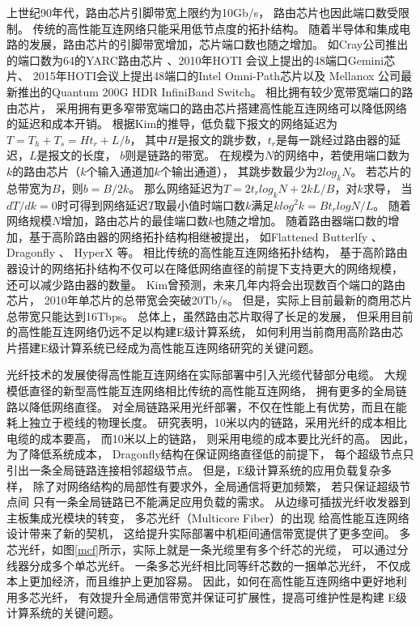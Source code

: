 上世纪90年代，路由芯片引脚带宽上限约为10Gb/s，
路由芯片也因此端口数受限制。
传统的高性能互连网络只能采用低节点度的拓扑结构。
随着半导体和集成电路的发展，路由芯片的引脚带宽增加，芯片端口数也随之增加。
如Cray公司推出的端口数为64的YARC路由芯片
、2010年HOTI
会议上提出的48端口Gemini芯片、
2015年HOTI会议上提出48端口的Intel Omni-Path芯片以及
Mellanox 公司最新推出的Quantum 200G HDR InfiniBand Switch。
相比拥有较少宽带宽端口的路由芯片，
采用拥有更多窄带宽端口的路由芯片搭建高性能互连网络可以降低网络的延迟和成本开销。
根据Kim的推导，低负载下报文的网络延迟为$T=T_h+T_s=Ht_r+L/b$，
其中$H$是报文的跳步数，$t_r$是每一跳经过路由器的延迟，$L$是报文的长度，
$b$则是链路的带宽。
在规模为$N$的网络中，若使用端口数为$k$的路由芯片（$k$个输入通道加$k$个输出通道），
其跳步数最少为$2log_kN$。
若芯片的总带宽为$B$，则$b=B/2k$。
那么网络延迟为$T=2t_rlog_kN+2kL/B$，对$k$求导，
当$dT/dk=0$时可得到网络延迟$T$取最小值时端口数$k$满足$klog^2k=Bt_rlogN/L$。
随着网络规模$N$增加，路由芯片的最佳端口数$k$也随之增加。
随着路由器端口数的增加，基于高阶路由器的网络拓扑结构相继被提出，
如Flattened Butterlfy 、Dragonfly 、
HyperX 等。
相比传统的高性能互连网络拓扑结构，
基于高阶路由器设计的网络拓扑结构不仅可以在降低网络直径的前提下支持更大的网络规模，
还可以减少路由器的数量。
Kim曾预测，未来几年内将会出现数百个端口的路由芯片，
2010年单芯片的总带宽会突破20Tb/s。
但是，实际上目前最新的商用芯片总带宽只能达到16Tbps。
总体上，虽然路由芯片取得了长足的发展，
但采用目前的高性能互连网络仍远不足以构建E级计算系统，
如何利用当前商用高阶路由芯片搭建E级计算系统已经成为高性能互连网络研究的关键问题。

光纤技术的发展使得高性能互连网络在实际部署中引入光缆代替部分电缆。
大规模低直径的新型高性能互连网络相比传统的高性能互连网络，
拥有更多的全局链路以降低网络直径。
对全局链路采用光纤部署，不仅在性能上有优势，而且在能耗上独立于榄线的物理长度。
研究表明，10米以内的链路，采用光纤的成本相比电缆的成本要高，
而10米以上的链路，
则采用电缆的成本要比光纤的高。
因此，为了降低系统成本，
Dragonfly结构在保证网络直径低的前提下，
每个超级节点只引出一条全局链路连接相邻超级节点。
但是，E级计算系统的应用负载复杂多样，
除了对网络结构的局部性有要求外，全局通信将更加频繁，
若只保证超级节点间
只有一条全局链路已不能满足应用负载的需求。
从边缘可插拔光纤收发器到主板集成光模块的转变，
多芯光纤（Multicore Fiber）的出现
给高性能互连网络设计带来了新的契机，
这给提升实际部署中机柜间通信带宽提供了更多空间。
多芯光纤，如图\ref{mcf}所示，实际上就是一条光缆里有多个纤芯的光缆，
可以通过分线器分成多个单芯光纤。
一条多芯光纤相比同等纤芯数的一捆单芯光纤，
不仅成本上更加经济，而且维护上更加容易。
因此，如何在高性能互连网络中更好地利用多芯光纤，
有效提升全局通信带宽并保证可扩展性，提高可维护性是构建
E级计算系统的关键问题。

